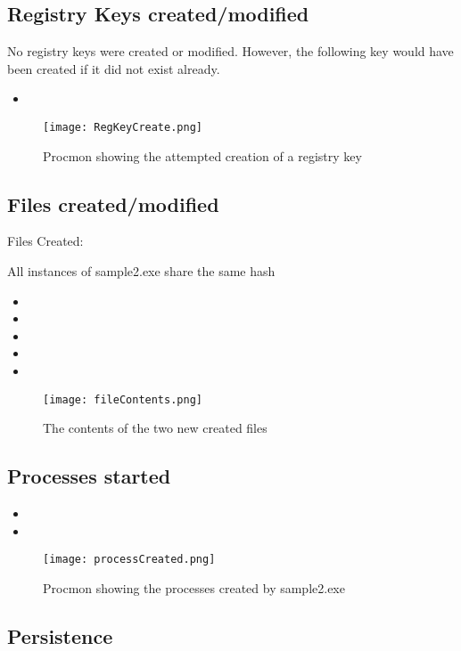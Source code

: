 \documentclass{article}
\begin{document}
    \subsection{Registry Keys created/modified}
    No registry keys were created or modified. However, the following key would have been created if it did not exist already.
    \begin{itemize}
        \item {}
    \end{itemize}
    \begin{figure}[h]
        \texttt{[image: RegKeyCreate.png]}
        \caption{Procmon showing the attempted creation of a registry key}
    \end{figure}

    \subsection{Files created/modified}
    Files Created:


    All instances of sample2.exe share the same hash
    \begin{itemize}
        \item {}
        \item {}
        \item {}
        \item {}
        \item {}
    \end{itemize}
    \begin{figure}[h]
        \texttt{[image: fileContents.png]}
        \caption{The contents of the two new created files}
    \end{figure}
    \subsection{Processes started}
    \begin{itemize}
        \item {}
        \item {}
    \end{itemize}
    \begin{figure}[h]
        \texttt{[image: processCreated.png]}
        \caption{Procmon showing the processes created by sample2.exe}
    \end{figure}
    \subsection{Persistence}
\end{document}

